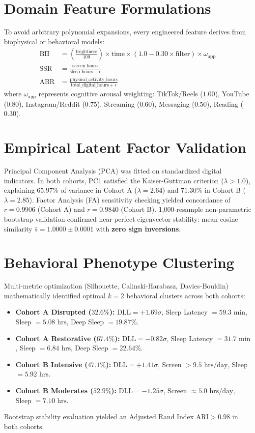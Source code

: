 \documentclass[10pt,twocolumn,a4paper]{article}
\begin{document}
\section{Domain Feature Formulations}
To avoid arbitrary polynomial expansions, every engineered feature derives from biophysical or behavioral models:
\begin{align}
    \text{BII} &= \left(\frac{\text{brightness}}{100}\right) \times \text{time} \times (1.0 - 0.30 \times \text{filter}) \times \omega_{\text{app}} \\
    \text{SSR} &= \frac{\text{screen\_hours}}{\text{sleep\_hours} + \epsilon} \\
    \text{ABR} &= \frac{\text{physical\_activity\_hours}}{\text{total\_digital\_hours} + \epsilon}
\end{align}
where $\omega_{\text{app}}$ represents cognitive arousal weighting: TikTok/Reels ($1.00$), YouTube ($0.80$), Instagram/Reddit ($0.75$), Streaming ($0.60$), Messaging ($0.50$), Reading ($0.30$).

\section{Empirical Latent Factor Validation}
Principal Component Analysis (PCA) was fitted on standardized digital indicators. In both cohorts, PC1 satisfied the Kaiser-Guttman criterion ($\lambda > 1.0$), explaining $65.97\%$ of variance in Cohort A ($\lambda = 2.64$) and $71.30\%$ in Cohort B ($\lambda = 2.85$). 
Factor Analysis (FA) sensitivity checking yielded concordance of $r = 0.9906$ (Cohort A) and $r = 0.9840$ (Cohort B).
1,000-resample non-parametric bootstrap validation confirmed near-perfect eigenvector stability: mean cosine similarity $\bar{s} = 1.0000 \pm 0.0001$ with \textbf{zero sign inversions}.

\section{Behavioral Phenotype Clustering}
Multi-metric optimization (Silhouette, Calinski-Harabasz, Davies-Bouldin) mathematically identified optimal $k = 2$ behavioral clusters across both cohorts:
\begin{itemize}
    \item \textbf{Cohort A Disrupted ($32.6\%$):} $\text{DLL} = +1.69\sigma$, Sleep Latency $= 59.3\text{ min}$, Sleep $= 5.08\text{ hrs}$, Deep Sleep $= 19.87\%$.
    \item \textbf{Cohort A Restorative ($67.4\%$):} $\text{DLL} = -0.82\sigma$, Sleep Latency $= 31.7\text{ min}$, Sleep $= 6.84\text{ hrs}$, Deep Sleep $= 22.64\%$.
    \item \textbf{Cohort B Intensive ($47.1\%$):} $\text{DLL} = +1.41\sigma$, Screen $> 9.5\text{ hrs/day}$, Sleep $= 5.92\text{ hrs}$.
    \item \textbf{Cohort B Moderates ($52.9\%$):} $\text{DLL} = -1.25\sigma$, Screen $\approx 5.0\text{ hrs/day}$, Sleep $= 7.10\text{ hrs}$.
\end{itemize}
Bootstrap stability evaluation yielded an Adjusted Rand Index $\text{ARI} > 0.98$ in both cohorts.
\end{document}
